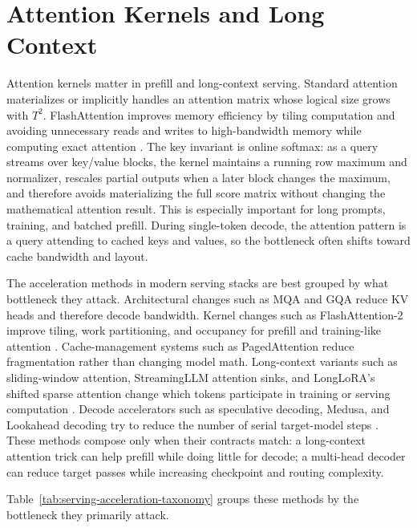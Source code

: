 \section{Attention Kernels and Long Context}
\label{sec:attention-kernels-long-context}

Attention kernels matter in prefill and long-context serving. Standard attention materializes or implicitly handles an attention matrix whose logical size grows with $T^2$. FlashAttention improves memory efficiency by tiling computation and avoiding unnecessary reads and writes to high-bandwidth memory while computing exact attention \cite{dao2022flashattention}. The key invariant is online softmax: as a query streams over key/value blocks, the kernel maintains a running row maximum and normalizer, rescales partial outputs when a later block changes the maximum, and therefore avoids materializing the full score matrix without changing the mathematical attention result. This is especially important for long prompts, training, and batched prefill. During single-token decode, the attention pattern is a query attending to cached keys and values, so the bottleneck often shifts toward cache bandwidth and layout.

The acceleration methods in modern serving stacks are best grouped by what bottleneck they attack. Architectural changes such as MQA and GQA reduce KV heads and therefore decode bandwidth. Kernel changes such as FlashAttention-2 improve tiling, work partitioning, and occupancy for prefill and training-like attention \cite{dao2023flashattention2}. Cache-management systems such as PagedAttention reduce fragmentation rather than changing model math. Long-context variants such as sliding-window attention, StreamingLLM attention sinks, and LongLoRA's shifted sparse attention change which tokens participate in training or serving computation \cite{xiao2023streamingllm,chen2023longlora}. Decode accelerators such as speculative decoding, Medusa, and Lookahead decoding try to reduce the number of serial target-model steps \cite{leviathan2023fast,cai2024medusa,fu2024lookahead}. These methods compose only when their contracts match: a long-context attention trick can help prefill while doing little for decode; a multi-head decoder can reduce target passes while increasing checkpoint and routing complexity.

Table~\ref{tab:serving-acceleration-taxonomy} groups these methods by the bottleneck they primarily attack.

